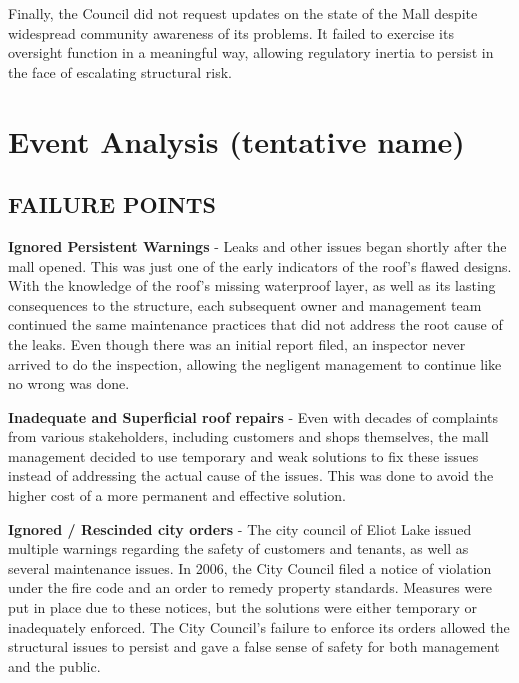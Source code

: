 \documentclass[12pt]{article}
\begin{document}
Finally, the Council did not request updates on the state of the Mall despite widespread community awareness of its problems. It failed to exercise its oversight function in a meaningful way, allowing regulatory inertia to persist in the face of escalating structural risk.

\section{Event Analysis (tentative name)} %




\subsection{FAILURE POINTS}

\textbf{Ignored Persistent Warnings} - Leaks and other issues began shortly after the mall opened. This was just one of the early indicators of the roof's flawed designs. With the knowledge of the roof's missing waterproof layer, as well as its lasting consequences to the structure, each subsequent owner and management team continued the same maintenance practices that did not address the root cause of the leaks. Even though there was an initial report filed, an inspector never arrived to do the inspection, allowing the negligent management to continue like no wrong was done.
 
\textbf{Inadequate and Superficial roof repairs} - Even with decades of complaints from various stakeholders, including customers and shops themselves, the mall management decided to use temporary and weak solutions to fix these issues instead of addressing the actual cause of the issues. This was done to avoid the higher cost of a more permanent and effective solution.
 
\textbf{Ignored / Rescinded city orders} - The city council of Eliot Lake issued multiple warnings regarding the safety of customers and tenants, as well as several maintenance issues. In 2006, the City Council filed a notice of violation under the fire code and an order to remedy property standards. Measures were put in place due to these notices, but the solutions were either temporary or inadequately enforced. The City Council's failure to enforce its orders allowed the structural issues to persist and gave a false sense of safety for both management and the public.
\end{document}
